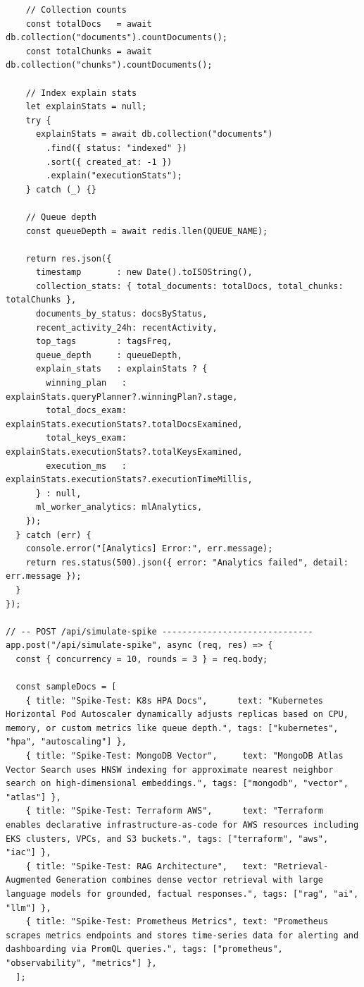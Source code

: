 \documentclass[12pt,a4paper]{report}
\begin{document}
\begin{lstlisting}
    // Collection counts
    const totalDocs   = await db.collection("documents").countDocuments();
    const totalChunks = await db.collection("chunks").countDocuments();

    // Index explain stats
    let explainStats = null;
    try {
      explainStats = await db.collection("documents")
        .find({ status: "indexed" })
        .sort({ created_at: -1 })
        .explain("executionStats");
    } catch (_) {}

    // Queue depth
    const queueDepth = await redis.llen(QUEUE_NAME);

    return res.json({
      timestamp       : new Date().toISOString(),
      collection_stats: { total_documents: totalDocs, total_chunks: totalChunks },
      documents_by_status: docsByStatus,
      recent_activity_24h: recentActivity,
      top_tags        : tagsFreq,
      queue_depth     : queueDepth,
      explain_stats   : explainStats ? {
        winning_plan   : explainStats.queryPlanner?.winningPlan?.stage,
        total_docs_exam: explainStats.executionStats?.totalDocsExamined,
        total_keys_exam: explainStats.executionStats?.totalKeysExamined,
        execution_ms   : explainStats.executionStats?.executionTimeMillis,
      } : null,
      ml_worker_analytics: mlAnalytics,
    });
  } catch (err) {
    console.error("[Analytics] Error:", err.message);
    return res.status(500).json({ error: "Analytics failed", detail: err.message });
  }
});

// -- POST /api/simulate-spike ------------------------------
app.post("/api/simulate-spike", async (req, res) => {
  const { concurrency = 10, rounds = 3 } = req.body;

  const sampleDocs = [
    { title: "Spike-Test: K8s HPA Docs",      text: "Kubernetes Horizontal Pod Autoscaler dynamically adjusts replicas based on CPU, memory, or custom metrics like queue depth.", tags: ["kubernetes", "hpa", "autoscaling"] },
    { title: "Spike-Test: MongoDB Vector",     text: "MongoDB Atlas Vector Search uses HNSW indexing for approximate nearest neighbor search on high-dimensional embeddings.", tags: ["mongodb", "vector", "atlas"] },
    { title: "Spike-Test: Terraform AWS",      text: "Terraform enables declarative infrastructure-as-code for AWS resources including EKS clusters, VPCs, and S3 buckets.", tags: ["terraform", "aws", "iac"] },
    { title: "Spike-Test: RAG Architecture",   text: "Retrieval-Augmented Generation combines dense vector retrieval with large language models for grounded, factual responses.", tags: ["rag", "ai", "llm"] },
    { title: "Spike-Test: Prometheus Metrics", text: "Prometheus scrapes metrics endpoints and stores time-series data for alerting and dashboarding via PromQL queries.", tags: ["prometheus", "observability", "metrics"] },
  ];


\end{lstlisting}
\end{document}
